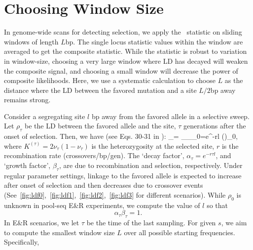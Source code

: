 \section{Choosing Window Size}\label{sec:winSize}
In genome-wide scans for detecting selection, we apply the \comale\
statistic on sliding windows of length $L$bp. The single locus
statistic values within the window are averaged to get the composite
statistic. While the statistic is robust to variation in window-size,
choosing a very large window where LD has decayed will weaken the
composite signal, and choosing a small window will decrease the power
of composite likelihoods. Here, we use a systematic calculation to
choose $L$ as the distance where the LD between the favored mutation
and a site $L/2$bp away remains strong.



Consider a segregating site $l$ bp away from the favored allele in a
selective sweep.  Let $\rho_\tau$ be the LD between the favored allele
and the site, $\tau$ generations after the onset of selection. Then,
we have (see Eqs. 30-31 in \cite{stephan2006hitchhiking}): \beq
\rho_\tau= \alpha_\tau\beta_\tau \rho_0=e^{-r\tau l}
\left(\right)\rho_0\label{eq:ldt}, \eeq
where $K^{(\tau)}=2\nu_\tau(1-\nu_\tau)$ is the heterozygosity at the
selected site, $r$ is the recombination rate (crossovers/bp/gen). The
`decay factor', $\alpha_\tau=e^{-r\tau l}$, and `growth factor',
$\beta_\tau$, are due to recombination and selection, respectively.
Under regular parameter settings, linkage to the favored allele is
expected to increase after onset of selection and then 
decreases due to crossover events
(See~\ref{fig:ldf0},~\ref{fig:ldf1},~\ref{fig:ldf2},~\ref{fig:ldf3}
for different scenarios\VB{Change to one figure}).  While $\rho_0$ is
unknown in pool-seq E\&R experiments, we compute the value of $l$ so
that
\[\alpha_\tau \beta_\tau=1.
\]
In E\&R scenarios, we let $\tau$ be the time of the last sampling. For
given $s$, we aim to compute the smallest window size $L$ over all
possible starting frequencies. Specifically,


